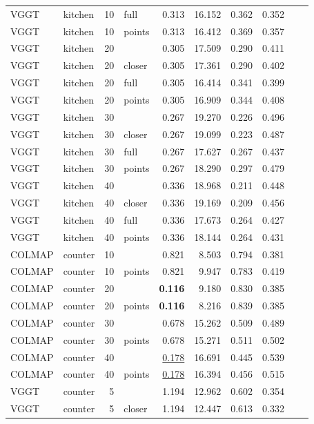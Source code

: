 \begin{table}[H]
\begin{tabular}{llrlrrrrll}
VGGT & kitchen & 10 & full & 0.313 & 16.152 & 0.362 & 0.352 &  &  \\
VGGT & kitchen & 10 & points & 0.313 & 16.412 & 0.369 & 0.357 &  &  \\
VGGT & kitchen & 20 &  & 0.305 & 17.509 & 0.290 & 0.411 &  &  \\
VGGT & kitchen & 20 & closer & 0.305 & 17.361 & 0.290 & 0.402 &  &  \\
VGGT & kitchen & 20 & full & 0.305 & 16.414 & 0.341 & 0.399 &  &  \\
VGGT & kitchen & 20 & points & 0.305 & 16.909 & 0.344 & 0.408 &  &  \\
VGGT & kitchen & 30 &  & 0.267 & 19.270 & 0.226 & 0.496 &  &  \\
VGGT & kitchen & 30 & closer & 0.267 & 19.099 & 0.223 & 0.487 &  &  \\
VGGT & kitchen & 30 & full & 0.267 & 17.627 & 0.267 & 0.437 &  &  \\
VGGT & kitchen & 30 & points & 0.267 & 18.290 & 0.297 & 0.479 &  &  \\
VGGT & kitchen & 40 &  & 0.336 & 18.968 & 0.211 & 0.448 &  &  \\
VGGT & kitchen & 40 & closer & 0.336 & 19.169 & 0.209 & 0.456 &  &  \\
VGGT & kitchen & 40 & full & 0.336 & 17.673 & 0.264 & 0.427 &  &  \\
VGGT & kitchen & 40 & points & 0.336 & 18.144 & 0.264 & 0.431 &  &  \\
\midrule
COLMAP & counter & 10 &  & 0.821 & 8.503 & 0.794 & 0.381 &  &  \\
COLMAP & counter & 10 & points & 0.821 & 9.947 & 0.783 & 0.419 &  &  \\
COLMAP & counter & 20 &  & \textbf{0.116} & 9.180 & 0.830 & 0.385 &  &  \\
COLMAP & counter & 20 & points & \textbf{0.116} & 8.216 & 0.839 & 0.385 &  &  \\
COLMAP & counter & 30 &  & 0.678 & 15.262 & 0.509 & 0.489 &  &  \\
COLMAP & counter & 30 & points & 0.678 & 15.271 & 0.511 & 0.502 &  &  \\
COLMAP & counter & 40 &  & \underline{0.178} & 16.691 & 0.445 & 0.539 &  &  \\
COLMAP & counter & 40 & points & \underline{0.178} & 16.394 & 0.456 & 0.515 &  &  \\
VGGT & counter & 5 &  & 1.194 & 12.962 & 0.602 & 0.354 &  &  \\
VGGT & counter & 5 & closer & 1.194 & 12.447 & 0.613 & 0.332 &  &  \\

\end{tabular}
\end{table}

